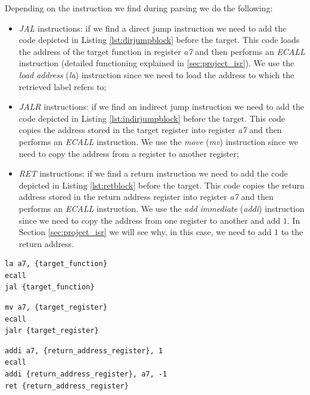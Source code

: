 Depending on the instruction we find during parsing we do the following:
\begin{itemize}
  \item \textit{JAL} instructions: if we find a direct jump instruction we need to
    add the code depicted in Listing \ref{lst:dirjumpblock} before the target.
    This code loads the address of the target function in register \textit{a7} and
    then performs an \textit{ECALL} instruction (detailed functioning explained in
    \ref{sec:project_isr}). We use the \textit{load address} (\textit{la}) instruction
    since we need to load the address to which the retrieved label refers to;

  \item \textit{JALR} instructions: if we find an indirect jump instruction we need
    to add the code depicted in Listing \ref{lst:indirjumpblock} before the target.
    This code copies the address stored in the target register into register
    \textit{a7} and then performs an \textit{ECALL} instruction. We use the \textit{move}
    (\textit{mv}) instruction since we need to copy the address from a register to
    another register;

  \item \textit{RET} instructions: if we find a return instruction we need to add
    the code depicted in Listing \ref{lst:retblock} before the target. This code
    copies the return address stored in the return address register into
    register \textit{a7} and then performs an \textit{ECALL} instruction. We use
    the \textit{add immediate} (\textit{addi}) instruction since we need to copy
    the address from one register to another and add $1$. In Section
    \ref{sec:project_isr} we will see why, in this case, we need to add $1$ to
    the return address.
\end{itemize}

\begin{lstlisting}[style=Assembly, caption = Direct jump code block, label={lst:dirjumpblock}]
la a7, {target_function}
ecall
jal {target_function}
\end{lstlisting}

\begin{lstlisting}[style=Assembly, caption = Indirect jump code block, label={lst:indirjumpblock}]
mv a7, {target_register}
ecall
jalr {target_register}
\end{lstlisting}

\begin{lstlisting}[style=Assembly, caption = Return code block, label={lst:retblock}]
addi a7, {return_address_register}, 1
ecall
addi {return_address_register}, a7, -1
ret {return_address_register}
\end{lstlisting}

